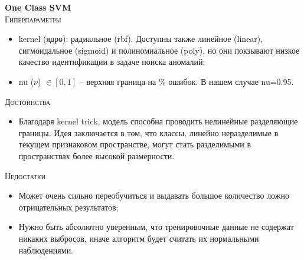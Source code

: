 \documentclass[12pt]{article}
\begin{document}
    \textbf{One Class SVM} \\

    \noindent \textsc{Гиперпараметры}
    \begin{itemize}
        \item kernel (ядро): радиальное (rbf). Доступны также линейное (linear), сигмоидальное (sigmoid) и полиномиальное (poly), но они покзывают низкое качество идентификации в задаче поиска аномалий:
        \item nu ($\nu$) $\in [0, 1]$ – верхняя граница на \% ошибок. В нашем случае nu=0.95.
    \end{itemize}

    \noindent \textsc{Достоинства}
    \begin{itemize}
        \item Благодаря kernel trick, модель способна проводить нелинейные разделяющие границы. Идея заключается в том, что классы, линейно неразделимые в текущем признаковом пространстве, могут стать разделимыми в пространствах более высокой размерности.
    \end{itemize}
    
    \noindent \textsc{Недостатки}
    \begin{itemize}
        \item Может очень сильно переобучиться и выдавать большое количество ложно отрицательных результатов;
        \item Нужно быть абсолютно уверенным, что тренировочные данные не содержат никаких выбросов, иначе алгоритм будет считать их нормальными наблюдениями.
    \end{itemize}
\end{document}
